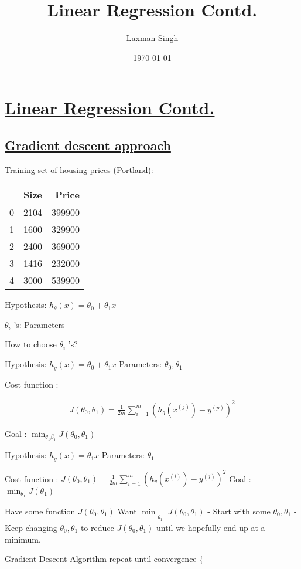 \documentclass[12pt,a4paper]{article}
\author{Laxman Singh}
\date{\today}
\title{Linear Regression Contd.}
\begin{document}
   \section*{  \underline{ Linear Regression Contd. }  } 
    \subsection*{  \underline{ Gradient descent approach }  }  

    Training set of housing prices (Portland):

\begin{tabular}{|rrr|} 
& Size & Price \\
\hline 0 & 2104 & 399900 \\
1 & 1600 & 329900 \\
2 & 2400 & 369000 \\
3 & 1416 & 232000 \\
4 & 3000 & 539900 \\
\hline
\end{tabular}

Hypothesis: \(h_\theta(x)=\theta_0+\theta_1 x\)

\(\theta_i\) 's: Parameters

How to choose \(\theta_i\) 's? 

Hypothesis: \(h_y(x)=\theta_0+\theta_1 x\)
Parameters: \(\theta_0, \theta_1\)

Cost function :

\begin{align*}
J\left(\theta_0, \theta_1\right)=\frac{1}{2 m} \sum_{i=1}^m\left(h_q\left(x^{(j)}\right)-y^{(p)}\right)^2
\end{align*}


Goal : \(\min _{\theta_1 \beta_1} J\left(\theta_0, \theta_1\right)\)

Hypothesis: \(h_y(x)=\theta_1 x\)
Parameters: \(\theta_1\)

Cost function :
\(J\left(\theta_0, \theta_1\right)=\frac{1}{2 m} \sum_{i=1}^m\left(h_v\left(x^{(i)}\right)-y^{(j)}\right)^2\)
Goal : \(\min _{\theta_1} J\left(\theta_1\right)\)

Have some function \(J\left(\theta_0, \theta_1\right)\)
Want \(\min _{\substack{ \\\theta_1}} J\left(\theta_0, \theta_1\right)\)
- Start with some \(\theta_0, \theta_1\)
- Keep changing \(\theta_0, \theta_1\) to reduce \(J\left(\theta_0, \theta_1\right)\) until we hopefully end up at a minimum.

Gradient Descent Algorithm
repeat until convergence \{
\end{document}
